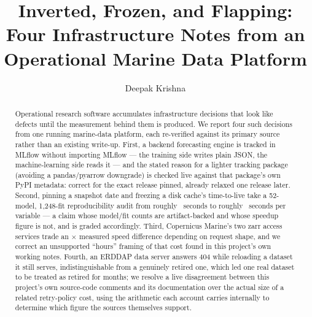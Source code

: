 \documentclass[runningheads]{llncs}
\begin{document}
\title{Inverted, Frozen, and Flapping: Four Infrastructure Notes from an
Operational Marine Data Platform}


\author{Deepak Krishna}

\maketitle

\begin{abstract}
Operational research software accumulates infrastructure decisions that look
like defects until the measurement behind them is produced. We report four
such decisions from one running marine-data platform, each re-verified
against its primary source rather than an existing write-up. First, a
backend forecasting engine is tracked in MLflow without importing MLflow ---
the training side writes plain JSON, the machine-learning side reads it ---
and the stated reason for a lighter tracking package (avoiding a
pandas/pyarrow downgrade) is checked live against that package's own PyPI
metadata: correct for the exact release pinned, already relaxed one release
later. Second, pinning a snapshot date and freezing a disk cache's
time-to-live take a 52-model, 1,248-fit reproducibility audit from roughly
\AuditSecondsUncached{}~seconds to roughly \AuditSecondsCached{}~seconds per
variable --- a claim whose model/fit counts are artifact-backed and whose
speedup figure is not, and is graded accordingly. Third, Copernicus Marine's
two zarr access services trade an \ArcoSlowdownFactor{}$\times$ measured
speed difference depending on request shape, and we correct an unsupported
``hours'' framing of that cost found in this project's own working notes.
Fourth, an ERDDAP data server answers 404 while reloading a dataset it still
serves, indistinguishable from a genuinely retired one, which led one real
dataset to be treated as retired for months; we resolve a live disagreement
between this project's own source-code comments and its documentation over
the actual size of a related retry-policy cost, using the arithmetic each
account carries internally to determine which figure the sources themselves
support.
\end{abstract}
\end{document}
